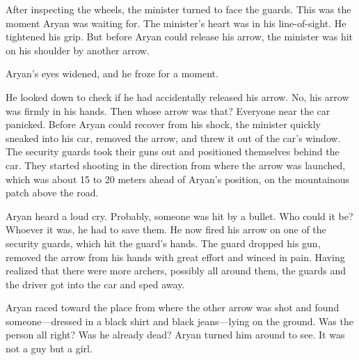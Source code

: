 After inspecting the wheels, the minister turned to face the guards. This was
the moment Aryan was waiting for. The minister's heart was in his line-of-sight.
He tightened his grip. But before Aryan could release his arrow, the minister
was hit on his shoulder by another arrow.

Aryan's eyes widened, and he froze for a moment.

He looked down to check if he had accidentally released his arrow. No, his arrow
was firmly in his hands. Then whose arrow was that? Everyone near the car
panicked. Before Aryan could recover from his shock, the minister quickly
sneaked into his car, removed the arrow, and threw it out of the car's window.
The security guards took their guns out and positioned themselves behind the
car. They started shooting in the direction from where the arrow was launched,
which was about 15 to 20 meters ahead of Aryan's position, on the mountainous
patch above the road.

Aryan heard a loud cry. Probably, someone was hit by a bullet. Who could it be?
Whoever it was, he had to save them. He now fired his arrow on one of the
security guards, which hit the guard's hands. The guard dropped his gun, removed
the arrow from his hands with great effort and winced in pain. Having realized
that there were more archers, possibly all around them, the guards and the
driver got into the car and sped away.

Aryan raced toward the place from where the other arrow was shot and found
someone—dressed in a black shirt and black jeans—lying on the ground. Was
the person all right? Was he already dead? Aryan turned him around to see. It
was not a guy but a girl.
